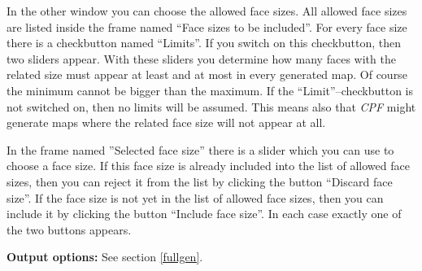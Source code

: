 \documentclass[a4paper]{article}
\begin{document}
In the other window you can choose the allowed face sizes. All allowed face
sizes are listed inside the frame named ``Face sizes to be included''. For
every face size there is a checkbutton named ``Limits''. If you switch on this
checkbutton, then two sliders appear. With these sliders you determine
how many faces with the related size must appear at least and at most in every
generated map. Of course the minimum cannot be bigger than the maximum. If the
``Limit''--checkbutton is not switched on, then no limits will be assumed.
This means also that \textit{CPF} might generate maps where the related face
size will not appear at all.

In the frame named ''Selected face size'' there is a slider which you can use
to choose a face size. If this face size is already included into the list of
allowed face sizes, then you can reject it from the list by clicking the 
button ``Discard face size''. If the face size is not yet in the list of
allowed face sizes, then you can include it by clicking the button
``Include face size''. In each case exactly one of the two buttons appears. 

\noindent\textbf{Output options:} See section \ref{fullgen}.
\end{document}
